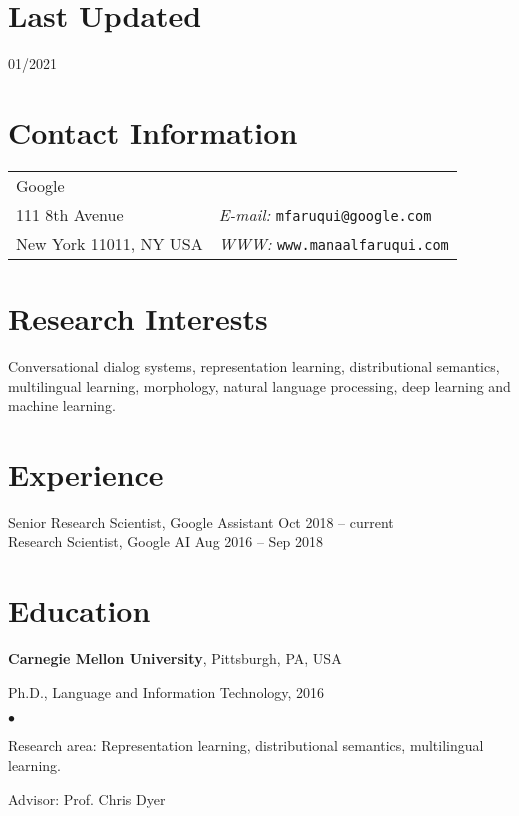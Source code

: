 \documentclass[margin,line]{res}
\newenvironment{list1}{
  \begin{list}{\ding{113}}{%
      \setlength{\itemsep}{0in}
      \setlength{\parsep}{0in} \setlength{\parskip}{0in}
      \setlength{\topsep}{0in} \setlength{\partopsep}{0in}
      \setlength{\leftmargin}{0.17in}}}{\end{list}}
\newenvironment{list2}{
  \begin{list}{$\bullet$}{%
      \setlength{\itemsep}{0in}
      \setlength{\parsep}{0in} \setlength{\parskip}{0in}
      \setlength{\topsep}{0in} \setlength{\partopsep}{0in}
      \setlength{\leftmargin}{0.2in}}}{\end{list}}
\begin{document}

\begin{resume}

\section{\sc Last Updated}

01/2021

\section{\sc Contact Information}
\vspace{.05in}
\begin{tabular}{@{}p{2in}p{4in}}
Google & \\
111 8th Avenue & {\it E-mail:}  \tt{mfaruqui@google.com}\\
New York 11011, NY USA &  {\it WWW:}  \tt{www.manaalfaruqui.com}\\
\end{tabular}

\section{\sc Research Interests}

Conversational dialog systems, representation learning,
distributional semantics, multilingual learning,
morphology, natural language processing, deep learning and machine learning.

\section{\sc Experience}
Senior Research Scientist, Google Assistant \hfill {Oct 2018 -- current}\\
Research Scientist, Google AI \hfill {Aug 2016 -- Sep 2018}

\section{\sc Education}
{\bf Carnegie Mellon University}, Pittsburgh, PA, USA\\
\vspace*{-.1in}
\begin{list1}
\item[] Ph.D., Language and Information Technology, 2016
\begin{list2}
\vspace*{.05in}
\item Research area: Representation learning, distributional semantics, multilingual learning.
\item Advisor:  Prof. Chris Dyer
\end{list2}
\end{list1}


\end{resume}
\end{document}
